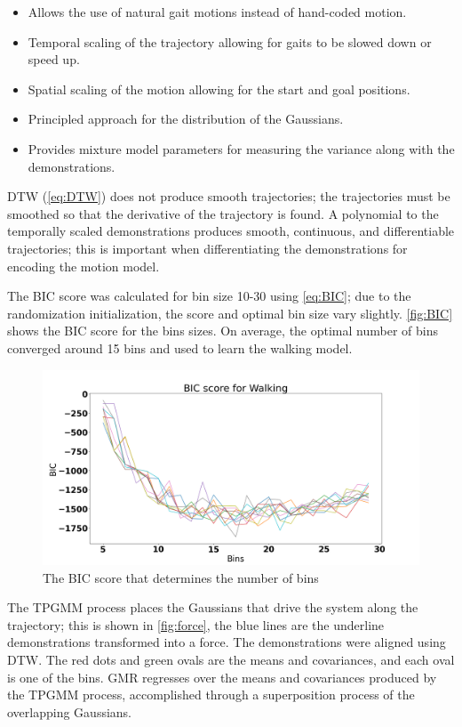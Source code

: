 \begin{itemize}
    \item Allows the use of natural gait motions instead of hand-coded motion.
    \item Temporal scaling of the trajectory allowing for gaits to be slowed down or speed up.
    \item Spatial scaling of the motion allowing for the start and goal positions.
    \item Principled approach for the distribution of the Gaussians.
    \item Provides mixture model parameters for measuring the variance along with the demonstrations.
\end{itemize}


DTW (\autoref{eq:DTW}) does not produce smooth trajectories; the trajectories must be smoothed so that the derivative of the trajectory is found.
A polynomial to the temporally scaled demonstrations produces smooth, continuous, and differentiable trajectories; this is important when differentiating the demonstrations for encoding the motion model. 




The BIC score was calculated for bin size 10-30 using  \autoref{eq:BIC}; due to the randomization initialization, the score and optimal bin size vary slightly. \autoref{fig:BIC} shows the BIC score for the bins sizes. On average, the optimal number of bins converged around 15 bins and used to learn the walking model.    

\begin{figure}
    \centering
    \includegraphics[scale=0.3]{images/gait_data/BIC_Walk.png}
    \caption[BIC score for walking]{The BIC score that determines the number of bins}
    \label{fig:BIC}
\end{figure}

The TPGMM process places the Gaussians that drive the system along the trajectory; this is shown in \autoref{fig:force}, the blue lines are the underline demonstrations transformed into a force.  The demonstrations were aligned using DTW. The red dots and green ovals are the means and covariances, and each oval is one of the bins. GMR regresses over the means and covariances produced by the TPGMM process, accomplished through a superposition process of the overlapping Gaussians. 

